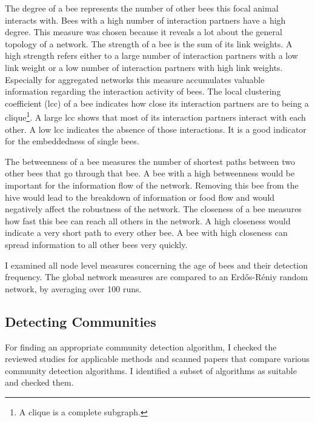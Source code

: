 The degree of a bee represents the number of other bees this focal animal interacts with.
Bees with a high number of interaction partners have a high degree.
This measure was chosen because it reveals a lot about the general topology of a network.
The strength of a bee is the sum of its link weights.
A high strength refers either to a large number of interaction partners with a low link weight or a low number of interaction partners with high link weights.
Especially for aggregated networks this measure accumulates valuable information regarding the interaction activity of bees.
The local clustering coefficient (lcc) of a bee indicates how close its interaction partners are to being a clique\footnote{A clique is a complete subgraph.}.
A large lcc shows that most of its interaction partners interact with each other.
A low lcc indicates the absence of those interactions.
It is a good indicator for the embeddedness of single bees.

The betweenness of a bee measures the number of shortest paths between two other bees that go through that bee.
A bee with a high betweenness would be important for the information flow of the network.
Removing this bee from the hive would lead to the breakdown of information or food flow and would negatively affect the robustness of the network.
The closeness of a bee measures how fast this bee can reach all others in the network.
A high closeness would indicate a very short path to every other bee.
A bee with high closeness can spread information to all other bees very quickly.

I examined all node level measures concerning the age of bees and their detection frequency. The global network measures are compared to an Erd\H{o}s-R\'{e}niy random network, by averaging over 100 runs.



\subsection{Detecting Communities}
\label{subsec:APcommunityDet}
For finding an appropriate community detection algorithm, I checked the reviewed studies for applicable methods and scanned papers that compare various community detection algorithms.
I identified a subset of algorithms as suitable and checked them.

